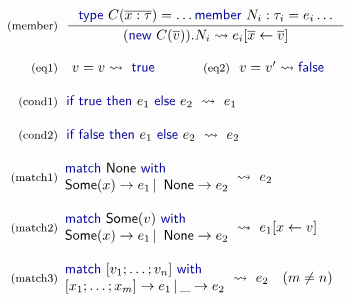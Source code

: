 \documentclass[10pt,preprint,blind,clearpagebib]{sigplanconf}
\newcommand{\kvd}[1]{\textnormal{\textcolor{kvdclr}{\sffamily #1}}}
\newcommand{\ident}[1]{\textnormal{\sffamily #1}}
\newcommand{\reduce}{\rightsquigarrow}
\begin{document}
\begin{figure}
\noindent
\begin{equation*}
\begin{array}{rl}
 \textnormal{\footnotesize{(member)}}&
 \hspace{-0.4em}
 \inference
 { \kvd{type}~C(\overline{x:\tau})=\ldots \kvd{member}~N_i : \tau_i = e_i \ldots }
 { (\kvd{new}~C(\overline{v})).N_i \reduce e_i[\overline{x} \leftarrow \overline{v}] }\\
 \\
 \textnormal{\footnotesize{(eq1)}}&
 v=v\reduce\kvd{true} \qquad \textnormal{\footnotesize{(eq2)}}~~v=v'\reduce\kvd{false}\\
 \\
 \textnormal{\footnotesize{(cond1)}}&
 \hspace{-0.4em}
 \kvd{if}~\kvd{true}~\kvd{then}~e_1~\kvd{else}~e_2 ~\reduce~ e_1 \\
 \\
 \textnormal{\footnotesize{(cond2)}}&
 \hspace{-0.4em}
 \kvd{if}~\kvd{false}~\kvd{then}~e_1~\kvd{else}~e_2 ~\reduce~ e_2 \\
 \\
 \textnormal{\footnotesize{(match1)}}&
 \hspace{-1em}
 \begin{array}{l}
  \kvd{match}~\ident{None}~\kvd{with} \\
  \ident{Some}(x) \rightarrow e_1 \,|\, \ident{None} \rightarrow e_2
 \end{array} \hspace{-0.5em} ~\reduce~ e_2 \\
 \\
 \textnormal{\footnotesize{(match2)}}&
 \hspace{-1em}
 \begin{array}{l}
    \kvd{match}~\ident{Some}(v)~\kvd{with} \\
    \ident{Some}(x) \rightarrow e_1 \,|\, \ident{None} \rightarrow e_2
 \end{array} \hspace{-0.5em} ~\reduce~ e_1[x\leftarrow v]\\
 \\
 \textnormal{\footnotesize{(match3)}}&
 \hspace{-1em}
 \begin{array}{l}
  \kvd{match}~[v_1;\ldots;v_n]~\kvd{with} \\[0em]
  [x_1;\ldots;x_m ] \rightarrow e_1 \,|\, \_ \rightarrow e_2
 \end{array} \hspace{-0.5em} ~\reduce~ e_2\quad(m\neq n) \\

\end{array}
\end{equation*}
\end{figure}
\end{document}
